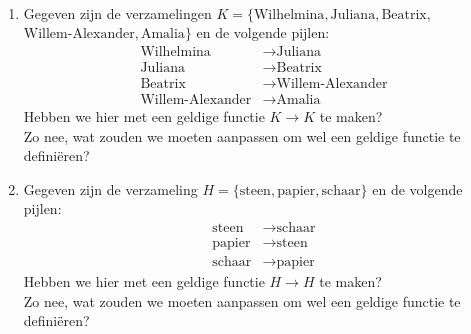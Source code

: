 \begin{exercise}\mbox{}\\
  \begin{enumerate}[label=\textbf{\alph*.}]
    \item Gegeven zijn de verzamelingen $K = \{ \text{Wilhelmina}, \text{Juliana}, \text{Beatrix},$\\ $\text{Willem-Alexander}, \text{Amalia} \}$ en de volgende pijlen:
  \begin{align*}
    \text{Wilhelmina} &\longrightarrow \text{Juliana}\\
    \text{Juliana} &\longrightarrow \text{Beatrix}\\
    \text{Beatrix} &\longrightarrow \text{Willem-Alexander}\\
    \text{Willem-Alexander} &\longrightarrow \text{Amalia}
  \end{align*} Hebben we hier met een geldige functie $K \to K$ te maken?\\ Zo nee, wat zouden we moeten aanpassen om wel een geldige functie te defini\"{e}ren?\\

  \item Gegeven zijn de verzameling $H = \{ \text{steen}, \text{papier}, \text{schaar} \}$ en de volgende pijlen:
  \begin{align*}
    \text{steen} &\longrightarrow \text{schaar}\\
    \text{papier} &\longrightarrow \text{steen}\\
    \text{schaar} &\longrightarrow \text{papier}
  \end{align*} Hebben we hier met een geldige functie $H \to H$ te maken?\\ Zo nee, wat zouden we moeten aanpassen om wel een geldige functie te defini\"{e}ren?
  \end{enumerate}
\end{exercise}

